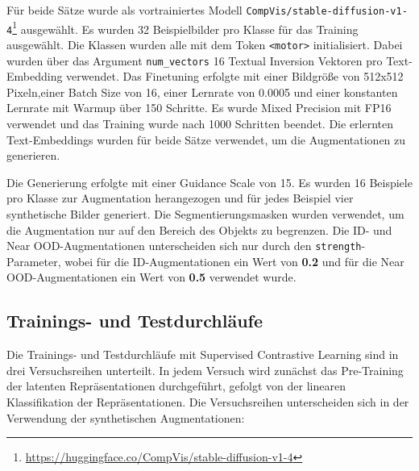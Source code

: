Für beide Sätze wurde als vortrainiertes Modell \lstinline{CompVis/stable-diffusion-v1-4}\footnote{\url{https://huggingface.co/CompVis/stable-diffusion-v1-4}} ausgewählt. Es wurden 32 Beispielbilder pro Klasse für das Training ausgewählt. Die Klassen wurden alle mit dem Token \lstinline{<motor>} initialisiert. Dabei wurden über das Argument \lstinline{num_vectors} 16 Textual Inversion Vektoren pro Text-Embedding verwendet. Das Finetuning erfolgte mit einer Bildgröße von 512x512 Pixeln,einer Batch Size von 16, einer Lernrate von 0.0005 und einer konstanten Lernrate mit Warmup über 150 Schritte. Es wurde Mixed Precision mit FP16 verwendet und das Training wurde nach 1000 Schritten beendet. Die erlernten Text-Embeddings wurden für beide Sätze verwendet, um die Augmentationen zu generieren.

Die Generierung erfolgte mit einer Guidance Scale von 15. Es wurden 16 Beispiele pro Klasse zur Augmentation herangezogen und für jedes Beispiel vier synthetische Bilder generiert. Die Segmentierungsmasken wurden verwendet, um die Augmentation nur auf den Bereich des Objekts zu begrenzen. Die ID- und Near OOD-Augmentationen unterscheiden sich nur durch den \lstinline{strength}-Parameter, wobei für die ID-Augmentationen ein Wert von \textbf{0.2} und für die Near OOD-Augmentationen ein Wert von \textbf{0.5} verwendet wurde.

\subsection{Trainings- und Testdurchläufe} \label{subsec:supcon-setup}

Die Trainings- und Testdurchläufe mit Supervised Contrastive Learning sind in drei Versuchsreihen unterteilt. In jedem Versuch wird zunächst das Pre-Training der latenten Repräsentationen durchgeführt, gefolgt von der linearen Klassifikation der Repräsentationen. Die Versuchsreihen unterscheiden sich in der Verwendung der synthetischen Augmentationen:

